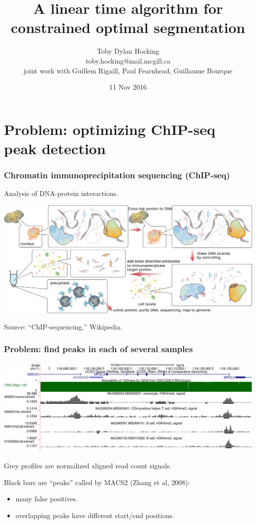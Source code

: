 \documentclass{beamer}
\begin{document}
\title{A linear time algorithm for constrained 
optimal segmentation}

\author{
  Toby Dylan Hocking\\
  toby.hocking@mail.mcgill.ca\\
  joint work with Guillem Rigaill, Paul Fearnhead, 
  Guillaume Bourque}

\date{11 Nov 2016}

\maketitle

\section{Problem: optimizing ChIP-seq peak detection}

\begin{frame}
  \frametitle{Chromatin immunoprecipitation sequencing (ChIP-seq)}
  Analysis of DNA-protein interactions.

  \includegraphics[width=\textwidth]{Chromatin_immunoprecipitation_sequencing_wide.png}

  Source: ``ChIP-sequencing,'' Wikipedia.
\end{frame}

\begin{frame}
  \frametitle{Problem: find peaks in each of several samples}
  \includegraphics[width=\textwidth]{screenshot-ucsc-edited}

  Grey profiles are normalized aligned read count signals.

  Black bars are ``peaks'' called by MACS2 (Zhang et al, 2008):
  \begin{itemize}
  \item \alert<1>{many false positives}.
  \item overlapping peaks have different start/end positions.
  \end{itemize}
\end{frame}
\end{document}
